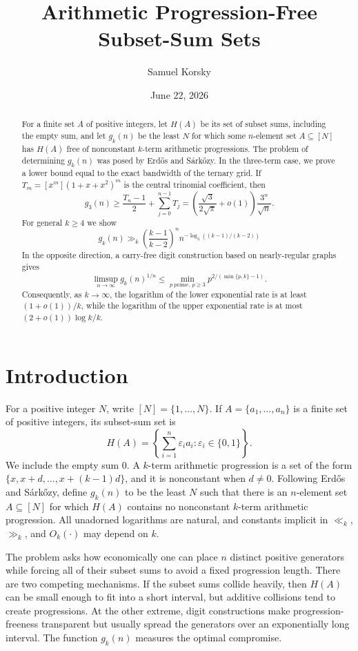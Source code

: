 \documentclass[11pt]{article}
\title{\textbf{Arithmetic Progression-Free Subset-Sum Sets}}
\author{Samuel Korsky}
\date{June 22, 2026}
\numberwithin{equation}{section}
\theoremstyle{definition}
\theoremstyle{remark}
\newcommand{\eps}{\varepsilon}
\begin{document}
\maketitle

\begin{abstract}
\noindent
For a finite set $A$ of positive integers, let $H(A)$ be its set of subset sums, including the empty sum, and let $g_k(n)$ be the least $N$ for which some $n$-element set $A\subseteq[N]$ has $H(A)$ free of nonconstant $k$-term arithmetic progressions. The problem of determining $g_k(n)$ was posed by Erd\H{o}s and S\'ark\H{o}zy. In the three-term case, we prove a lower bound equal to the exact bandwidth of the ternary grid. If $T_m=[x^m](1+x+x^2)^m$ is the central trinomial coefficient, then
\[
g_3(n)\ge \frac{T_n-1}{2}+\sum_{j=0}^{n-1}T_j
 =\left(\frac{\sqrt{3}}{2\sqrt{\pi}}+o(1)\right)\frac{3^n}{\sqrt{n}}.
\]
For general $k \ge 4$ we show
\[
g_k(n)\gg_k \left(\frac{k-1}{k-2}\right)^n
n^{-\log_2((k-1)/(k-2))}
\]
In the opposite direction, a carry-free digit construction based on nearly-regular graphs gives
\[
\limsup_{n\to\infty}g_k(n)^{1/n}
 \le \min_{p\ \mathrm{prime},\ p\ge3}p^{2/(\min\{p,k\}-1)}.
\]
Consequently, as $k\to\infty$, the logarithm of the lower exponential rate is at least $(1+o(1))/k$, while the logarithm of the upper exponential rate is at most $(2+o(1))\log k/k$.
\end{abstract}

\section{Introduction}

For a positive integer $N$, write $[N]=\{1,\ldots,N\}$. If $A=\{a_1,\ldots,a_n\}$ is a finite set of positive integers, its subset-sum set is
\begin{equation}\label{eq:subset-sum-set}
H(A)=\left\{\sum_{i=1}^n\eps_i a_i:\eps_i\in\{0,1\}\right\}.
\end{equation}
We include the empty sum $0$. A $k$-term arithmetic progression is a set of the form $\{x,x+d,\ldots,x+(k-1)d\}$, and it is nonconstant when $d\ne0$. Following Erd\H{o}s and S\'ark\H{o}zy, define $g_k(n)$ to be the least $N$ such that there is an $n$-element set $A\subseteq[N]$ for which $H(A)$ contains no nonconstant $k$-term arithmetic progression. All unadorned logarithms are natural, and constants implicit in $\ll_k$, $\gg_k$, and $O_k(\cdot)$ may depend on $k$.

\bigskip
\noindent
The problem asks how economically one can place $n$ distinct positive generators while forcing all of their subset sums to avoid a fixed progression length. There are two competing mechanisms. If the subset sums collide heavily, then $H(A)$ can be small enough to fit into a short interval, but additive collisions tend to create progressions. At the other extreme, digit constructions make progression-freeness transparent but usually spread the generators over an exponentially long interval. The function $g_k(n)$ measures the optimal compromise.
\end{document}

